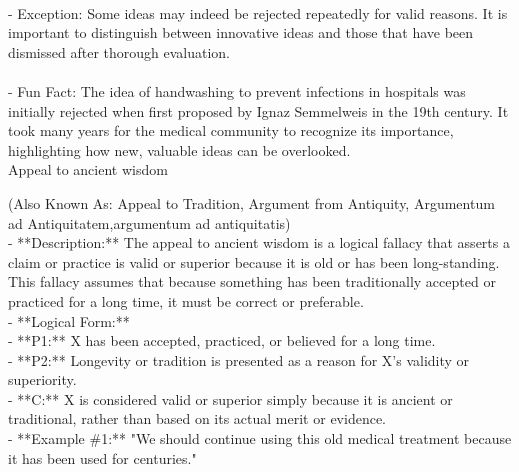 \documentclass[a4paper,12pt,single,pdftex]{scrartcl}
\begin{document}
    
      
    \\

    
      - Exception: Some ideas may indeed be rejected repeatedly for valid reasons. It is important to distinguish between innovative ideas and those that have been dismissed after thorough evaluation.
    \\

    
      
    \\

    
      - Fun Fact: The idea of handwashing to prevent infections in hospitals was initially rejected when first proposed by Ignaz Semmelweis in the 19th century. It took many years for the medical community to recognize its importance, highlighting how new, valuable ideas can be overlooked.
    \\

  

Appeal to ancient wisdom
    
      (Also Known As: Appeal to Tradition, Argument from Antiquity, Argumentum ad Antiquitatem,argumentum ad antiquitatis)
    \\

  
    
      - **Description:** The appeal to ancient wisdom is a logical fallacy that asserts a claim or practice is valid or superior because it is old or has been long-standing. This fallacy assumes that because something has been traditionally accepted or practiced for a long time, it must be correct or preferable.
    \\

    
      - **Logical Form:**
    \\

    
        - **P1:** X has been accepted, practiced, or believed for a long time.
    \\

    
        - **P2:** Longevity or tradition is presented as a reason for X’s validity or superiority.
    \\

    
        - **C:** X is considered valid or superior simply because it is ancient or traditional, rather than based on its actual merit or evidence.
    \\

    
      - **Example \#1:** "We should continue using this old medical treatment because it has been used for centuries."
    \\
\end{document}
